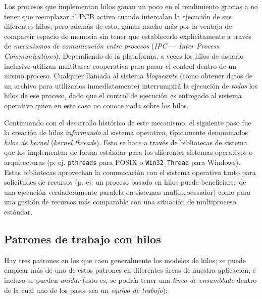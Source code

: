\documentclass[11pt,fleqn]{book} %
\begin{document}
Los procesos que implementan hilos ganan un poco en el rendimiento
gracias a no tener que reemplazar al PCB activo cuando intercalan la 
ejecución de sus diferentes hilos; pero además de esto, ganan mucho
más por la ventaja de compartir espacio de memoria sin tener que
establecerlo explícitamente a través de \emph{mecanismos de comunicación entre procesos} (\emph{IPC} — \emph{Inter Process Communications}). Dependiendo
de la plataforma, a veces los hilos de usuario inclusive utilizan
multitarea cooperativa para pasar el control dentro de un mismo
proceso. Cualquier llamada al sistema \emph{bloqueante} (como obtener datos
de un archivo para utilizarlos inmediatamente) interrumpirá la
ejecución de \emph{todos} los hilos de ese proceso, dado que
el control de ejecución es entregado al sistema operativo quien en
este caso no conoce nada sobre los hilos.


Continuando con el desarrollo histórico de este mecanismo, el
siguiente paso fue la creación de hilos \emph{informando} al sistema
operativo, típicamente denominados \emph{hilos de kernel} (\emph{kernel threads}). Esto se hace a través de bibliotecas de sistema que los
implementan de forma estándar para los diferentes sistemas operativos
o arquitecturas  (p. ej. \texttt{pthreads} para POSIX o \texttt{Win32\_Thread} para
Windows). Estas bibliotecas aprovechan la comunicación con el
sistema operativo tanto para solicitudes de recursos (p. ej. un proceso
basado en hilos puede beneficiarse de una ejecución verdaderamente
paralela en sistemas multiprocesador) como para una gestión de
recursos más comparable con una situación de multiproceso estándar.
\subsection{Patrones de trabajo con hilos}
\label{sec-3-2-2}


Hay tres patrones en los que caen generalmente los modelos de hilos;
se puede emplear más de uno de estos patrones en diferentes áreas de
nuestra aplicación, e incluso se pueden \emph{anidar} (esto es, se podría
tener una \emph{línea de ensamblado} dentro de la cual uno de los pasos sea
un \emph{equipo de trabajo}):
\end{document}
